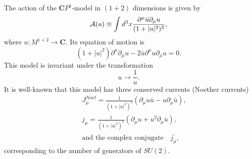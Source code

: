 \documentclass[makeidx,12pt,openany]{report}
\begin{document}
The action of the $\mathbf{C}P^1$-model in $(1+2)$ dimensions is given by
\begin{equation}
 \mbox{$\cal{A}$}(u) \equiv \int d^3 x 
 \frac{\partial^{\mu}\bar{u}\partial_{\mu}u}
                             {(1+|u|^2)^2},
\end{equation}
where \quad $u:M^{1+2} \rightarrow \mathbf{C}$. Its equation of motion is 
\begin{equation}
 (1+|u|^2)\partial^{\mu}\partial_{\mu}u
  -2\bar{u}\partial^{\mu}u\partial_{\mu}u =0.
 \label{eqn:28}
\end{equation}
This model is invariant under the transformation 
\begin{equation}
 u \rightarrow \frac{1}{u}.
 \label{eqn:29}
\end{equation}
It is well-known that this model has three conserved currents 
(Noether currents) 
 
\begin{eqnarray}
 && J_{\mu}^{Noet}=\frac{1}{(1+|u|^2)^2}
       (\partial_{\mu}u \bar{u}-u\partial_{\mu}\bar{u}), \label{eqn:30}\\
 && j_{\mu}=\frac{1}{(1+|u|^2)^2}
       (\partial_{\mu}u +u^2 \partial_{\mu}\bar{u}), \label{eqn:31}\\
 && \mbox{and the complex conjugate} \quad \bar{j_{\mu}},
  \label{eqn:32}
\end{eqnarray}
corresponding to the number of generators of $SU(2)$. 
\end{document}
